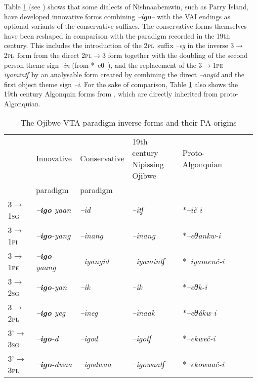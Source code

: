 \documentclass[twoside,a4paper,11pt]{article}
\newcommand{\ipa}[1]{{\phon\textit{#1}}}
\newcommand{\sg}{\textsc{sg}}
\newcommand{\pl}{\textsc{pl}}
\newcommand{\grise}[1]{\cellcolor{lightgray}\textbf{#1}}
\newcommand{\pli}{\textsc{pi}}
\newcommand{\pe}{\textsc{pe}}
\begin{document}
 Table \ref{tab:ojibwe.vta.2} (see \citealt[178-9]{valentine01grammar})  shows that some dialects of Nishnaabemwin,  such as Parry Island, have developed  innovative forms combining \ipa{--\textbf{igo}--} with the VAI endings as optional variants of the conservative suffixes. The conservative forms themselves have been reshaped in comparison with the paradigm recorded in the 19th century. This includes the introduction of the 2\pl\ suffix \ipa{--eg} in the inverse 3$\rightarrow$2\pl\ form from the direct 2\pl$\rightarrow$3 form together with the doubling of the second person theme sign \ipa{-in} (from *--eθ--), and the replacement of the 3$\rightarrow$1\pe\  \ipa{--iyamintʃ}  by an analysable form created by combining the direct \ipa{--angid} and the first object theme sign \ipa{--i}. For the sake of comparison,  Table \ref{tab:ojibwe.vta.2} also shows the 19th century Algonquin forms from \citet[51]{cuoq1866}, which are directly inherited from proto-Algonquian.

\begin{table}[H]
\caption{The Ojibwe VTA paradigm inverse forms and their PA origins}
\centering \label{tab:ojibwe.vta.2}
\begin{tabular}{llllllll}
\toprule
& Innovative & Conservative & 19th century Nipissing Ojibwe & Proto-Algonquian \\
&paradigm & paradigm&\\
\midrule
3$\rightarrow$1\sg &\ipa{--\textbf{igo}-yaan} \grise{}& 	\ipa{--id} & \ipa{--itʃ} &	 *\ipa{--ič-i} & 		\\
3$\rightarrow$1\pli & 	\ipa{--\textbf{igo}-yang} \grise{}& 	\ipa{--inang} &  	\ipa{--inang}  	 &*\ipa{--eθankw-i} & 		\\
3$\rightarrow$1\pe & 	\ipa{--\textbf{igo}-yaang} \grise{}& 	\ipa{--iyangid} \grise{}&	\ipa{--iyamintʃ}  &  *\ipa{--iyamenč-i} & 		\\
\midrule
3$\rightarrow$2\sg & 	\ipa{--\textbf{igo}-yan} \grise{}& 	\ipa{--ik} &	\ipa{--ik} &  *\ipa{--eθk-i} & 		\\
3$\rightarrow$2\pl & \ipa{--\textbf{igo}-yeg} \grise{}& 	\ipa{--ineg}  \grise{} & \ipa{--inaak}  & *\ipa{--eθâkw-i} & 		\\
\midrule
3'$\rightarrow$3\sg & \ipa{--\textbf{igo}-d} & 	\ipa{--igod} &		\ipa{--igotʃ} &*\ipa{--ekweč-i} & 		\\
3'$\rightarrow$3\pl & \ipa{--\textbf{igo}-dwaa}   & 	\ipa{--igodwaa}  \grise{}&\ipa{--igowaatʃ} &*\ipa{--ekowaač-i} & 		\\
\bottomrule
\end{tabular}
\end{table}
\end{document}
